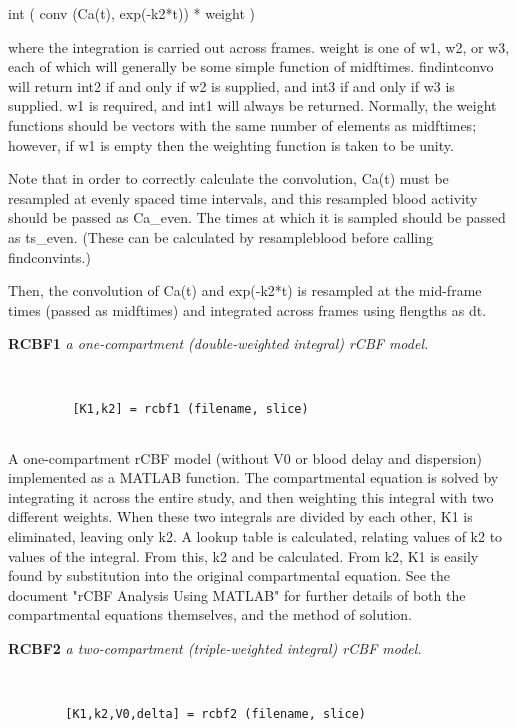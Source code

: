         int ( conv (Ca(t), exp(-k2*t)) * weight )
 
  where the integration is carried out across frames.  weight is
  one of w1, w2, or w3, each of which will generally be some simple
  function of midftimes.  findintconvo will return int2 if and only if
  w2 is supplied, and int3 if and only if w3 is supplied.  w1 is 
  required, and int1 will always be returned.  Normally, the weight
  functions should be vectors with the same number of elements as
  midftimes; however, if w1 is empty then the weighting function 
  is taken to be unity.
 
  Note that in order to correctly calculate the convolution, Ca(t) must
  be resampled at evenly spaced time intervals, and this resampled blood
  activity should be passed as Ca\_even.  The times at which it is
  sampled should be passed as ts\_even.  (These can be calculated by
  resampleblood before calling findconvints.)
 
  Then, the convolution of Ca(t) and exp(-k2*t) is resampled at the
  mid-frame times (passed as midftimes) and integrated across frames
  using flengths as dt.
\newpage


{\large\bf RCBF1} {\em a one-compartment (double-weighted integral) rCBF model.}
\begin{verbatim}


         [K1,k2] = rcbf1 (filename, slice)


\end{verbatim}

  A one-compartment rCBF model (without V0 or blood delay and 
  dispersion) implemented as a MATLAB function.  The
  compartmental equation is solved by integrating it across
  the entire study, and then weighting this integral with two
  different weights.  When these two integrals are divided by
  each other, K1 is eliminated, leaving only k2.  A lookup
  table is calculated, relating values of k2 to values of the
  integral.  From this, k2 and be calculated.  From k2, K1 is
  easily found by substitution into the original compartmental
  equation.  See the document "rCBF Analysis Using MATLAB" for
  further details of both the compartmental equations
  themselves, and the method of solution.
\newpage


{\large\bf RCBF2} {\em a two-compartment (triple-weighted integral) rCBF model.}
\begin{verbatim}


        [K1,k2,V0,delta] = rcbf2 (filename, slice)


\end{verbatim}

